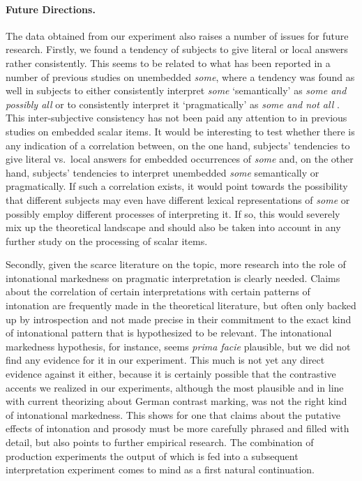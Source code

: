 \documentclass[fleqn,reqno,10pt,draft]{article}
\begin{document}
\paragraph{Future Directions.} The data obtained from our experiment
also raises a number of issues for future research. Firstly, we found
a tendency of subjects to give literal or local answers rather
consistently. This seems to be related to what has been reported in a
number of previous studies on unembedded \emph{some}, where a tendency
was found as well in subjects to either consistently interpret
\emph{some} `semantically' as \emph{some and possibly all} or to
consistently interpret it `pragmatically' as \emph{some and not all}
\citep[e.g.][]{NoveckPosada2003:Characterizing-,BottNoveck2004:Some-Utterances,DegenTanenhaus2012:Processing-Scal}. This
inter-subjective consistency has not been paid any attention to in
previous studies on embedded scalar items. It would be interesting to
test whether there is any indication of a correlation between, on the
one hand, subjects' tendencies to give literal vs.~local answers for
embedded occurrences of \emph{some} and, on the other hand, subjects'
tendencies to interpret unembedded \emph{some} semantically or
pragmatically. If such a correlation exists, it would point towards
the possibility that different subjects may even have different
lexical representations of \emph{some} or possibly employ different
processes of interpreting it. If so, this would severely mix up the
theoretical landscape and should also be taken into account in any
further study on the processing of scalar items.

Secondly, given the scarce literature on the topic, more research into
the role of intonational markedness on pragmatic interpretation is
clearly needed. Claims about the correlation of certain
interpretations with certain patterns of intonation are frequently
made in the theoretical literature, but often only backed up by
introspection and not made precise in their commitment to the exact
kind of intonational pattern that is hypothesized to be relevant. The
intonational markedness hypothesis, for instance, seems \emph{prima
  facie} plausible, but we did not find any evidence for it in our
experiment. This much is not yet any direct evidence against it
either, because it is certainly possible that the contrastive accents
we realized in our experiments, although the most plausible and in
line with current theorizing about German contrast marking, was not
the right kind of intonational markedness. This shows for one that
claims about the putative effects of intonation and prosody must be
more carefully phrased and filled with detail, but also points to
further empirical research. The combination of production experiments
the output of which is fed into a subsequent interpretation experiment
comes to mind as a first natural continuation.
\end{document}
